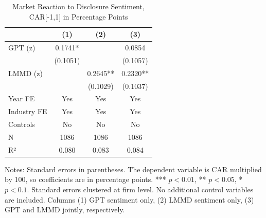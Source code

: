 \begin{table}[htbp]
\centering
\caption{Market Reaction to Disclosure Sentiment, CAR[-1,1] in Percentage Points}
\label{tab:car_sentiment_main}
\begin{tabular}{lccc}
\toprule
 & (1) & (2) & (3) \\
\midrule
GPT (z) & 0.1741* &  & 0.0854 \\
  & (0.1051) &  & (0.1057) \\
LMMD (z) &  & 0.2645** & 0.2320** \\
  &  & (0.1029) & (0.1037) \\
\midrule
Year FE & Yes & Yes & Yes \\
Industry FE & Yes & Yes & Yes \\
Controls & No & No & No \\
N & 1086 & 1086 & 1086 \\
R² & 0.080 & 0.083 & 0.084 \\
\bottomrule
\end{tabular}\begin{flushleft}
\footnotesize Notes: Standard errors in parentheses. The dependent variable is CAR multiplied by 100, so coefficients are in percentage points. *** $p<0.01$, ** $p<0.05$, * $p<0.1$. Standard errors clustered at firm level. No additional control variables are included. Columns (1) GPT sentiment only, (2) LMMD sentiment only, (3) GPT and LMMD jointly, respectively.
\end{flushleft}
\end{table}